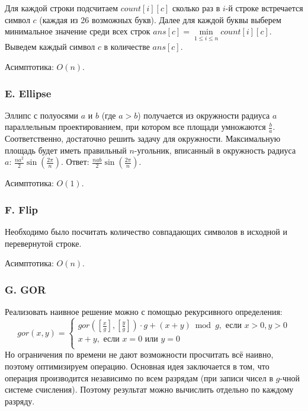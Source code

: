 
Для каждой строки подсчитаем $count[i][c]$ сколько раз в $i$-й строке встречается символ $c$ (каждая из 26 возможных букв). Далее для каждой буквы выберем минимальное значение среди всех строк $ans[c] = \min\limits_{1 \leqslant i \leqslant n} {count[i][c]}$. Выведем каждый символ $c$ в количестве $ans[c]$.

Асимптотика: $O(n)$.



\subsubsection*{E. Ellipse} 


Эллипс с полуосями $a$ и $b$ (где $a > b$) получается из окружности радиуса $a$ параллельным проектированием, при котором все площади умножаются $\frac{b}{a}$. Соответственно, достаточно решить задачу для окружности. Максимальную площадь будет иметь правильный $n$-угольник, вписанный в окружность радиуса~$a$: $\frac{n a^2}{2} \sin\left( \frac{2 \pi}{n} \right).$ Ответ: $\frac{n a b}{2} \sin\left( \frac{2 \pi}{n} \right).$

Асимптотика: $O(1)$.



\subsubsection*{F. Flip}


Необходимо было посчитать количество совпадающих символов в исходной и перевернутой строке.

Асимптотика: $O(n)$.



\subsubsection*{G. GOR} 


Реализовать наивное решение можно с помощью рекурсивного определения: 
$$gor(x, y) = 
\begin{cases}
gor([\frac{x}{g}], [\frac{y}{g}]) \cdot g  + (x + y ) \bmod g, \text{ если } x > 0, y > 0 \\
x + y, \text{ если } x = 0 \text{ или } y = 0 \\
\end{cases}
$$
Но ограничения по времени не дают возможности просчитать всё наивно, поэтому оптимизируем операцию. Основная идея заключается в том, что операция производится независимо по всем разрядам (при записи чисел в $g$-чной системе счисления). Поэтому результат можно вычислить отдельно по каждому разряду.

